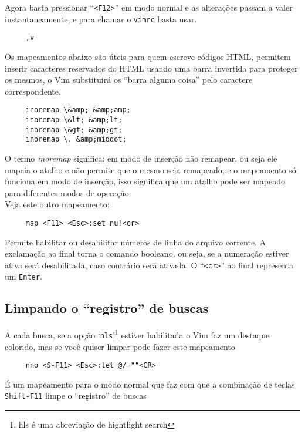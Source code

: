 Agora basta pressionar ``\verb|<F12>|'' em modo normal e as alterações passam a valer
instantaneamente, e para chamar o {\tt vimrc} basta usar.

\begin{verbatim}
     ,v
\end{verbatim}



Os mapeamentos abaixo são úteis
para quem escreve códigos HTML, permitem inserir caracteres reservados do HTML
usando uma barra invertida para proteger os mesmos, o Vim substituirá os ``barra
alguma coisa'' pelo caractere correspondente.

\begin{verbatim}
     inoremap \&amp; &amp;amp;
     inoremap \&lt; &amp;lt;
     inoremap \&gt; &amp;gt;
     inoremap \. &amp;middot;
\end{verbatim}

O termo {\em inoremap} significa: em modo de inserção não remapear, ou seja
ele mapeia o atalho e não permite que o mesmo seja remapeado, e o
mapeamento só funciona em modo de inserção, isso significa que um atalho
pode ser mapeado para diferentes modos de operação. \\


Veja este outro mapeamento:

\begin{verbatim}
     map <F11> <Esc>:set nu!<cr>
\end{verbatim}

Permite habilitar ou desabilitar números de linha do arquivo corrente.
A exclamação ao final torna o comando booleano, ou seja, se a
numeração estiver ativa será desabilitada, caso contrário será
ativada. O ``\verb|<cr>|'' ao final representa um {\tt Enter}.

\subsection{Limpando o ``registro'' de buscas}\label{Limpando o ``registro'' de buscas}

A cada busca, se a opção `{\tt hls}'\footnote{hls é uma abreviação de hightlight search}
estiver habilitada o Vim faz um destaque colorido, mas se você quiser limpar pode fazer este
mapeamento

\begin{verbatim}
     nno <S-F11> <Esc>:let @/=""<CR>
\end{verbatim}

É um mapeamento para o modo normal que faz com que a combinação de
teclas \verb|Shift-F11| limpe o ``registro'' de buscas


